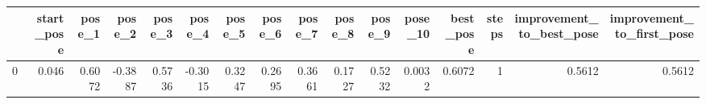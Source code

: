 \begin{tabular}{lrrrrrrrrrrrrrrr}
\toprule
{} &  start\_pose &  pose\_1 &  pose\_2 &  pose\_3 &  pose\_4 &  pose\_5 &  pose\_6 &  pose\_7 &  pose\_8 &  pose\_9 &  pose\_10 &  best\_pose &  steps &  improvement\_to\_best\_pose &  improvement\_to\_first\_pose \\
\midrule
0 &       0.046 &  0.6072 & -0.3887 &  0.5736 & -0.3015 &  0.3247 &  0.2695 &  0.3661 &  0.1727 &  0.5232 &   0.0032 &     0.6072 &      1 &                    0.5612 &                     0.5612 \\
\bottomrule
\end{tabular}
